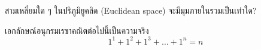 \documentclass[12pt,a4paper]{article}
\begin{document}
\begin{question}
    สามเหลี่ยมใด ๆ ในปริภูมิยูคลิด (Euclidean space) จะมีมุมภายในรวมเป็นเท่าใด?
\end{question}

\begin{theorem}
    เอกลักษณ์อนุกรมเรขาคณิตต่อไปนี้เป็นความจริง
    \[
        1^1 + 1^2 + 1^3 + \ldots + 1^n = n \tag*{\qedhere}    
    \]
\end{theorem}

{\elseries\lipsum[1]}

{\ltseries\lipsum[2]}

{\mdseries\lipsum[3]}

{\mbseries\lipsum[4]}

{\sbseries\lipsum[5]}

{\bfseries\lipsum[6]}

{\ebseries\lipsum[7]}
\end{document}
